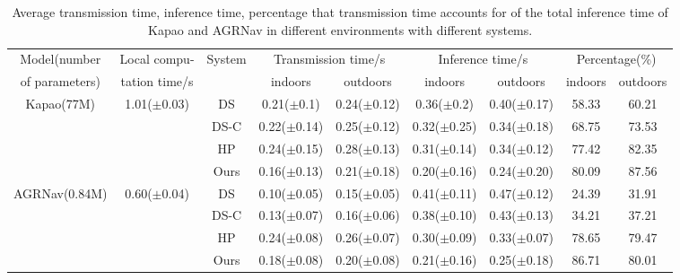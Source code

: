 \begin{table}[htb]
    
    \renewcommand\arraystretch{0.9}
    \centering
\begin{tabular}{ccc|c|c|c|c|c|c}
\toprule
Model(number & Local compu- & \multirow[c]{2}{*}{System} & \multicolumn{2}{|c|}{Transmission time/s} & \multicolumn{2}{|c|}{Inference time/s} & \multicolumn{2}{c}{Percentage(\%)} \\
of parameters)& tation time/s &  & indoors & outdoors & indoors & outdoors & indoors & outdoors \\
\midrule
\multirow[c]{4}{*}{Kapao(77M)} & \multirow[c]{4}{*}{1.01($\pm$0.03)} & DS & 0.21($\pm$0.1) & 0.24($\pm$0.12) & 0.36($\pm$0.2) & 0.40($\pm$0.17) & 58.33 & 60.21 \\
 &  & DS-C & 0.22($\pm$0.14) & 0.25($\pm$0.12) & 0.32($\pm$0.25) & 0.34($\pm$0.18) & 68.75 & 73.53 \\
 &  & HP & 0.24($\pm$0.15) & 0.28($\pm$0.13) & 0.31($\pm$0.14) & 0.34($\pm$0.12) & 77.42 & 82.35 \\
 &  & Ours & 0.16($\pm$0.13) & 0.21($\pm$0.18) & 0.20($\pm$0.16) & 0.24($\pm$0.20) & 80.09 & 87.56 \\
\cline{1-9} \cline{2-9}
\multirow[c]{4}{*}{AGRNav(0.84M)} & \multirow[c]{4}{*}{0.60($\pm$0.04)} & DS & 0.10($\pm$0.05) & 0.15($\pm$0.05) & 0.41($\pm$0.11) & 0.47($\pm$0.12) & 24.39 & 31.91\\
 &  & DS-C & 0.13($\pm$0.07) & 0.16($\pm$0.06) & 0.38($\pm$0.10) & 0.43($\pm$0.13) & 34.21 & 37.21\\
 &  & HP & 0.24($\pm$0.08) & 0.26($\pm$0.07) & 0.30($\pm$0.09) & 0.33($\pm$0.07) & 78.65 & 79.47 \\
 &  & Ours & 0.18($\pm$0.08) & 0.20($\pm$0.08) & 0.21($\pm$0.16) & 0.25($\pm$0.18) & 86.71 & 80.01 \\
\cline{1-9} \cline{2-9}
\bottomrule
\end{tabular}

    \caption{Average transmission time, inference time, percentage that transmission time accounts for of the total inference time of Kapao and AGRNav in different environments with different systems.}
    \label{tab:e2e_time}
\end{table}

